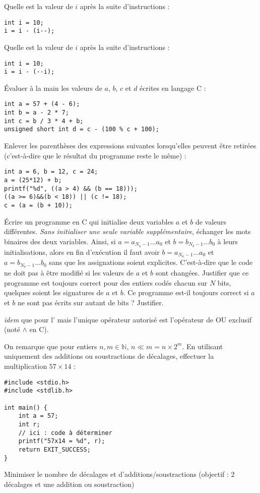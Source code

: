 \documentclass[../../../main.tex]{subfiles}
\begin{document}
Quelle est la valeur de $i$ après la suite d'instructions :
\begin{verbatim}
int i = 10;
i = i - (i--);
\end{verbatim}
Quelle est la valeur de $i$ après la suite d'instructions :
\begin{verbatim}
int i = 10;
i = i - (--i);
\end{verbatim}
\newline
Évaluer à la main les valeurs de $a$, $b$, $c$ et $d$ écrites en langage C :
\begin{verbatim}
int a = 57 + (4 - 6);
int b = a - 2 * 7;
int c = b / 3 * 4 + b;
unsigned short int d = c - (100 % c + 100);
\end{verbatim}
Enlever les parenthèses des expressions suivantes lorsqu'elles peuvent être retirées (c'est-à-dire que le résultat du programme reste le même) :
\begin{verbatim}
int a = 6, b = 12, c = 24;
a = (25*12) + b;
printf("%d", ((a > 4) && (b == 18)));
((a >= 6)&&(b < 18)) || (c != 18);
c = (a = (b + 10));
\end{verbatim}
 Écrire un programme en C qui initialise deux variables $a$ et $b$ de valeurs différentes. \textit{Sans initialiser une seule variable supplémentaire}, échanger les mots binaires des deux variables. Ainsi, si $a = a_{N_{a}-1}\dots{a_{0}}$ et $b = b_{N_{b}-1}\dots{b_{0}}$ à leurs initialisations, alors en fin d'exécution il faut avoir $b = a_{N_{a}-1}\dots{a_{0}}$ et $a = b_{N_{b}-1}\dots{b_{0}}$ sans que les assignations soient explicites. C'est-à-dire que le code ne doit pas à être modifié si les valeurs de $a$ et $b$ sont changées.\newline
Justifier que ce programme est toujours correct pour des entiers codés chacun sur $N$ bits, quelques soient les signatures de $a$ et $b$. Ce programme est-il toujours correct si $a$ et $b$ ne sont pas écrits sur autant de bits ? Justifier.
 
 \textit{idem} que pour l' mais l'unique opérateur autorisé est l'opérateur de OU exclusif (noté $\wedge$ en C).
 
\newline
On remarque que pour entiers $n, m\in{\mathbb{N}}$, $n\ll{m} = n\times2^{m}$. En utilisant uniquement des additions ou soustractions de décalages, effectuer la multiplication $57\times{14}$ :
\begin{verbatim}
#include <stdio.h>
#include <stdlib.h>

int main() {
	int a = 57;
	int r;
	// ici : code à déterminer
	printf("57x14 = %d", r);
	return EXIT_SUCCESS;
}
\end{verbatim}
Minimiser le nombre de décalages et d'additions/soustractions (objectif : 2 décalages et une addition ou soustraction)
 
\end{document}
